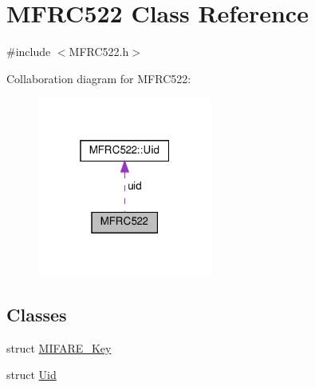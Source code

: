 \hypertarget{class_m_f_r_c522}{}\section{M\+F\+R\+C522 Class Reference}
\label{class_m_f_r_c522}


{\ttfamily \#include $<$M\+F\+R\+C522.\+h$>$}



Collaboration diagram for M\+F\+R\+C522\+:
\nopagebreak
\begin{figure}[H]
\begin{center}
\leavevmode
\includegraphics[width=163pt]{class_m_f_r_c522__coll__graph}
\end{center}
\end{figure}
\subsection*{Classes}
\begin{DoxyCompactItemize}
\item 
struct \hyperlink{struct_m_f_r_c522_1_1_m_i_f_a_r_e___key}{M\+I\+F\+A\+R\+E\+\_\+\+Key}
\item 
struct \hyperlink{struct_m_f_r_c522_1_1_uid}{Uid}
\end{DoxyCompactItemize}
